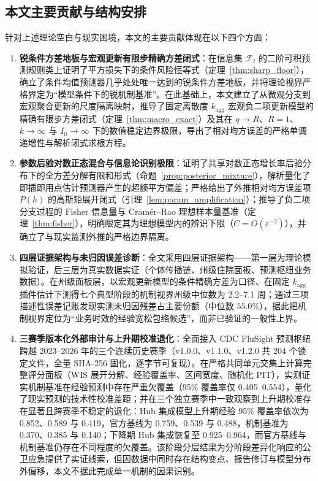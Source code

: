 \documentclass[10pt,a4paper]{article}
\theoremstyle{plain}
\theoremstyle{definition}
\begin{document}
\subsection{本文主要贡献与结构安排}

针对上述理论空白与现实困境，本文的主要贡献体现在以下四个方面：
\begin{enumerate}
\item \textbf{锐条件方差地板与宏观更新有限步精确方差闭式}：在信息集 $\mathcal{F}_t$ 的二阶可积预测规则类上证明了平方损失下的条件风险恒等式（定理~\ref{thm:sharp_floor}），确立了条件均值预测器几乎处处唯一达到的锐条件方差地板，并将理论视界严格界定为“模型条件下的锐机制基准”。在此基础上，本文建立了从微观分支到宏观聚合更新的尺度隔离映射，推导了固定离散度 $k_{\text{agg}}$ 宏观负二项更新模型的精确有限步方差闭式（定理~\ref{thm:macro_exact}）及其在 $q\to R$、$R=1$、$k\to\infty$ 与 $I_0\to\infty$ 下的数值稳定边界极限，导出了相对均方误差的严格单调递增性与解析闭式求根方程。
\item \textbf{参数后验对数正态混合与信息论识别极限}：证明了共享对数正态增长率后验分布下的全方差分解有限和形式（命题~\ref{prop:posterior_mixture}），解析量化了即插即用点估计预测器产生的超额平方偏差；严格给出了外推相对均方误差项 $P(h)$ 的高斯矩展开闭式（引理~\ref{lem:param_amplification}）；推导了负二项分支过程的 Fisher 信息量与 Cramér--Rao 理想样本量基准（定理~\ref{thm:fisher}），明确限定其为理想模型内的辨识下限（$C = O(\varepsilon^{-2})$），并确立了与现实监测外推的严格边界隔离。
\item \textbf{四层证据架构与未归因误差诊断}：全文采用四层证据架构——第一层为理论模拟验证，后三层为真实数据实证（个体传播链、州级住院面板、预测枢纽业务数据）。在州级面板层，以宏观更新模型的条件精确方差为口径、在固定 $k_{\text{agg}}$ 插件估计下测得七个典型阶段的机制视界州级中位数为 2.2--7.1 周；通过三项描述性误差记账发现实测未归因残差占主要份额（中位数 $55.0\%$），据此把机制视界定位为“业务时效的经验宽松包络候选”，而非已验证的一般性上界。
\item \textbf{三赛季版本化外部审计与上升期校准退化}：全面接入 CDC FluSight 预测枢纽跨越 2023--2026 年的三个连续历史赛季（v1.0.0、v1.1.0、v1.2.0 共 204 个锁定文件，全量 SHA-256 固化，逐字节可复现）。在严格共同单元交集上计算完整评分面板（WIS 展开分解、经验覆盖率、区间宽度、随机化 PIT），实测证实机制基准在经验预测中存在严重欠覆盖（95\% 覆盖率仅 0.405--0.554），量化了现实预测的技术性校准差距；并在三个独立赛季中一致观察到上升期校准存在显著且跨赛季不稳定的退化：Hub 集成模型上升期经验 95\% 覆盖率依次为 0.852、0.589 与 0.419，官方基线为 0.759、0.539 与 0.488，机制基准为 0.370、0.385 与 0.140；下降期 Hub 集成恢复至 0.925--0.964，而官方基线与机制基准仍存在不同程度的欠覆盖。该阶段分层结果为分阶段差异化响应的公卫应急提供了实证线索，但因数据中同时存在结构变点、报告修订与模型分布外偏移，本文不据此完成单一机制的因果识别。
\end{enumerate}
\end{document}
